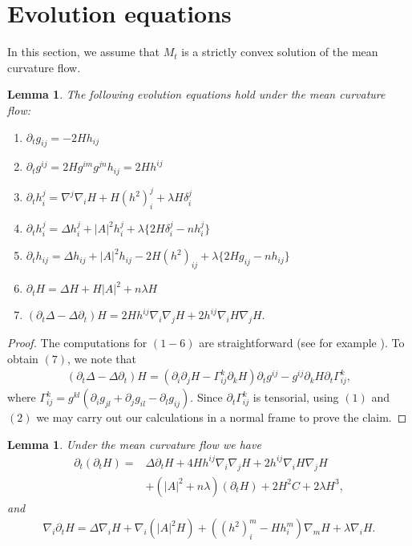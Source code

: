 \documentclass{amsart}
\newtheorem{lemma}[theorem]{Lemma}
\theoremstyle{definition}
\theoremstyle{remark}
\numberwithin{equation}{section}
\begin{document}
\section{Evolution equations}
In this section, we assume that $M_t$ is a strictly convex solution of the mean curvature flow.
\begin{lemma}\label{lem: lem3}
The following evolution equations hold under the mean curvature flow:
\begin{enumerate}
  \item $\partial_tg_{ij}=-2Hh_{ij}$
  \item $\partial_tg^{ij}=2Hg^{im}g^{jn}h_{ij}=2Hh^{ij}$
  \item $\partial_t h_i^j=\nabla^j\nabla_iH+H(h^2)_i^j+\lambda H\delta_i^j$
  \item $\partial_t h_i^j=\Delta h_i^j+|A|^2h_i^j+\lambda \{2H\delta_i^j-nh_i^j\}$
  \item $\partial_t h_{ij}=\Delta h_{ij}+|A|^2h_{ij}-2H(h^2)_{ij}+\lambda \{2Hg_{ij}-nh_{ij}\}$
  \item $\partial_t H=\Delta H+H|A|^2+n\lambda H$
  \item $(\partial_t\Delta-\Delta\partial_t)H=2Hh^{ij}\nabla_i\nabla_jH+2h^{ij}\nabla_iH\nabla_jH.$
\end{enumerate}
\end{lemma}
\begin{proof} The computations for $(1-6)$ are straightforward (see for example \cite{Huisken 87}). To obtain $(7)$, we note that
\begin{align*}
(\partial_t\Delta-\Delta\partial_t)H=\left(\partial_i\partial_jH-\Gamma_{ij}^k\partial_kH\right)\partial_tg^{ij}-g^{ij}\partial_kH\partial_t\Gamma_{ij}^k,
\end{align*}
where $\Gamma_{ij}^k=g^{kl}(\partial_ig_{jl}+\partial_jg_{il}-\partial_lg_{ij}).$ Since $\partial_t\Gamma_{ij}^k$ is tensorial, using $(1)$ and $ (2)$ we may carry out our calculations in a normal frame to prove the claim.
\end{proof}
\begin{lemma}\label{lem: lem1}
Under the mean curvature flow we have
\begin{align*}
\partial_t(\partial_tH)=&
\Delta \partial_tH+4Hh^{ij}\nabla_i\nabla_jH+2h^{ij}\nabla_iH\nabla_jH\\
&+(|A|^2+n\lambda )(\partial_t H)+2H^2C+2\lambda H^3,
\end{align*}
and
\begin{align*}
\nabla_i\partial_tH
=\Delta\nabla_iH+\nabla_i(|A|^2H)+((h^2)_i^m-Hh_i^m)\nabla_mH+\lambda \nabla_iH.
\end{align*}
\end{lemma}
\end{document}
